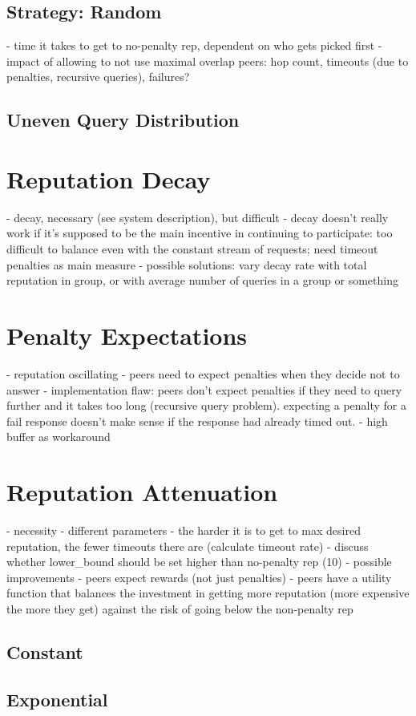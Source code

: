 \subsection{Strategy: Random}
- time it takes to get to no-penalty rep, dependent on who gets picked first
- impact of allowing to not use maximal overlap peers: hop count, timeouts (due
  to penalties, recursive queries), failures?
\subsection{Uneven Query Distribution}
\section{Reputation Decay}
- decay, necessary (see system description), but difficult
- decay doesn't really work if it's supposed to be the main incentive in
  continuing to participate: too difficult to balance even with the constant
  stream of requests; need timeout penalties as main measure
- possible solutions: vary decay rate with total reputation in group, or with
  average number of queries in a group or something
\section{Penalty Expectations}
- reputation oscillating
- peers need to expect penalties when they decide not to answer
- implementation flaw: peers don't expect penalties if they need to query
  further and it takes too long (recursive query problem). expecting a penalty
  for a fail response doesn't make sense if the response had already timed out.
- high buffer as workaround
\section{Reputation Attenuation}
- necessity
- different parameters
- the harder it is to get to max desired reputation, the fewer timeouts there
  are (calculate timeout rate)
- discuss whether lower\_bound should be set higher than no-penalty rep (10)
- possible improvements
    - peers expect rewards (not just penalties)
    - peers have a utility function that balances the investment in getting more
      reputation (more expensive the more they get) against the risk of going
      below the non-penalty rep
\subsection{Constant}
\subsection{Exponential}
